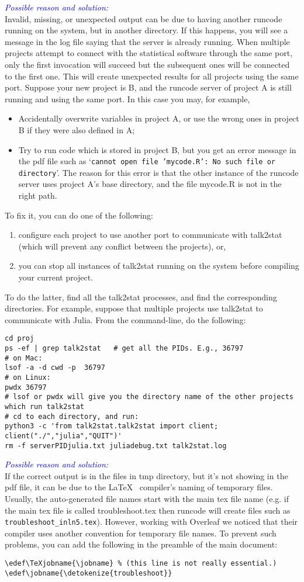 \documentclass[a4paper,10pt]{article}
\newcommand{\cause}[1] {\noindent\textit{\textcolor{blue}{Possible reason and solution:}}\\#1}
\begin{document}
\cause\bgroup
Invalid, missing, or unexpected output can be due to having another runcode running on the system, but in another directory. If this happens, you will see a message in the log file saying that the server is already running. When multiple projects attempt to connect with the statistical software through the same port, only the first invocation will succeed but the subsequent ones will be connected to  the first one. This will create unexpected results for all projects using the same port. Suppose your new project is B, and the runcode server of project A is still running and using the same port. In this case you may, for example,
\begin{itemize}
\item Accidentally overwrite variables in project A, or use the wrong ones in project B if they were also defined in A;
\item Try to run code which is stored in project B, but you get an error message in the pdf file such as `\texttt{cannot open file 'mycode.R': No such file or directory}'.   The reason for this error is that the other instance of the runcode server uses project A's base directory, and the file mycode.R is not in the right path.
\end{itemize}
To fix it, you can do one of the following:
\begin{enumerate}
\item configure each project to use another port to communicate with talk2stat (which will prevent any conflict between the projects), or,
\item you can stop all instances of talk2stat running on the system before compiling your current project.
\end{enumerate}
To do the latter, find all the talk2stat processes, and find the corresponding directories. For example, suppose that multiple projects use talk2stat to communicate with Julia. From the command-line, do the following:
\begin{Verbatim}
cd proj
ps -ef | grep talk2stat   # get all the PIDs. E.g., 36797
# on Mac:
lsof -a -d cwd -p  36797
# on Linux:
pwdx 36797
# lsof or pwdx will give you the directory name of the other projects which run talk2stat
# cd to each directory, and run:
python3 -c 'from talk2stat.talk2stat import client; client("./","julia","QUIT")'
rm -f serverPIDjulia.txt juliadebug.txt talk2stat.log
\end{Verbatim}
\egroup


\cause\bgroup
If the correct output is in the files in tmp directory, but it's not showing in the pdf file, it can be due to the \LaTeX~ compiler's naming of temporary files. Usually, the auto-generated file names start with the main tex file name (e.g. if the main tex file is called troubleshoot.tex then runcode will create files such as \verb|troubleshoot_inln5.tex|). However, working with Overleaf we noticed that their compiler uses another convention for temporary file names. To prevent such problems, you can add the following in the preamble of the main document:
\begin{Verbatim}
\edef\TeXjobname{\jobname} % (this line is not really essential.)
\edef\jobname{\detokenize{troubleshoot}}
\end{Verbatim}
\egroup
\end{document}
